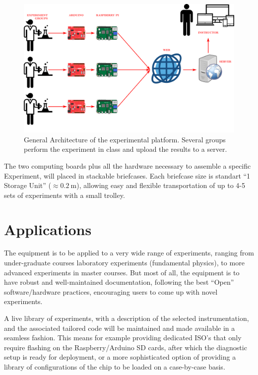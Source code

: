 \documentclass[conference]{IEEEtran}
\begin{document}
\begin{figure}[tbp]
\centerline{\includegraphics[width=1.4\columnwidth]{Multiple.png}}
\caption{General Architecture of the experimental platform. Several groups perform the experiment in class and upload the results to a server.}
\label{figMultiple}
\end{figure}

The two computing boards plus all the hardware necessary to assemble a specific Experiment, will placed in stackable briefcases.
Each briefcase size is standart “1 Storage Unit” ($\approx \SI{0.2}{\meter}$), allowing easy and flexible transportation of up to 4-5 sets of experiments with a small trolley.


\section{Applications}
The equipment is to be applied to a very wide range of experiments, ranging from under-graduate courses laboratory experiments (fundamental physics), 
to more advanced experiments in master courses. 
But most of all, the equipment is to have robust and well-maintained documentation, 
following the best ``Open'' software/hardware practices, encouraging users to come up with novel experiments.

A live library of experiments, with a description of the selected instrumentation, and the associated tailored code will be maintained and made available in a seamless fashion. 
This means for example providing dedicated ISO’s that only require flashing on the Raspberry/Arduino SD cards, after which the diagnostic setup is ready for deployment,
or a more sophisticated option of providing a library of configurations of the chip to be loaded on a case-by-case basis.
\end{document}
